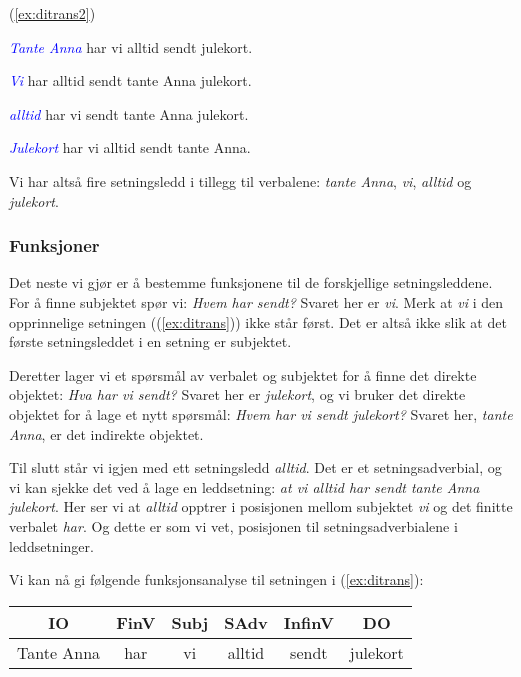 \documentclass{article}
\begin{document}
\begin{exe}
\ex\label{ex:ditrans2} (\ref{ex:ditrans2})
\begin{xlist}
\ex \textcolor{blue}{\it Tante Anna} har vi alltid sendt julekort.

\ex \textcolor{blue}{\it Vi} har alltid sendt tante Anna julekort.

\ex \textcolor{blue}{\it alltid} har vi sendt tante Anna julekort.

\ex \textcolor{blue}{\it Julekort} har vi alltid sendt tante Anna.
\end{xlist}
\end{exe}

Vi har alts{\aa} fire setningsledd i tillegg til verbalene: {\it tante Anna}, {\it vi}, {\it alltid} og {\it julekort}.

\subsubsection{Funksjoner}

Det neste vi gj{\o}r er {\aa} bestemme funksjonene til de forskjellige setningsleddene. For {\aa} finne subjektet sp{\o}r vi: {\it Hvem har sendt?} Svaret her er {\it vi}. Merk at {\it vi} i den opprinnelige setningen ((\ref{ex:ditrans})) ikke st{\aa}r f{\o}rst. Det er alts{\aa} ikke slik at det f{\o}rste setningsleddet i en setning er subjektet.

Deretter lager vi et sp{\o}rsm{\aa}l av verbalet og subjektet for {\aa} finne det direkte objektet: {\it Hva har vi sendt?} Svaret her er {\it julekort}, og vi bruker det direkte objektet for {\aa} lage et nytt sp{\o}rsm{\aa}l: {\it Hvem har vi sendt julekort?} Svaret her, {\it tante Anna}, er det indirekte objektet.

Til slutt st{\aa}r vi igjen med ett setningsledd {\it alltid}. Det er et setningsadverbial, og vi kan sjekke det ved {\aa} lage en leddsetning: {\it at vi alltid har sendt tante Anna julekort}. Her ser vi at {\it alltid} opptrer i posisjonen mellom subjektet {\it vi} og det finitte verbalet {\it har}. Og dette er som vi vet, posisjonen til setningsadverbialene i leddsetninger.

Vi kan n{\aa} gi f{\o}lgende funksjonsanalyse til setningen i (\ref{ex:ditrans}):

\begin{table}[!ht]
\begin{tabular}{|c|c|c|c|c|c|}
\hline
IO&FinV &Subj & SAdv & InfinV& DO\\\hline
Tante Anna & har & vi & alltid & sendt & julekort\\\hline
\end{tabular}
\end{table}
\end{document}
